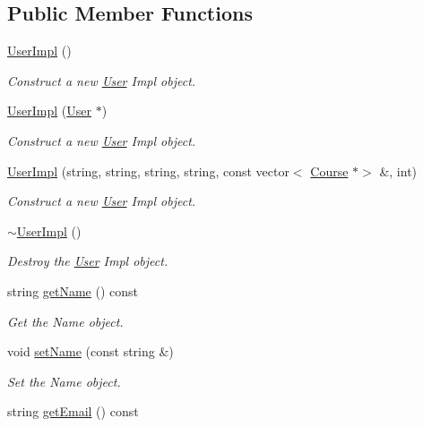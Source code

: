\subsection*{Public Member Functions}
\begin{DoxyCompactItemize}
\item 
\hyperlink{classUserImpl_a247633b3d3fb9449719bd9c12873b4cb}{User\+Impl} ()
\begin{DoxyCompactList}\small\item\em Construct a new \hyperlink{classUser}{User} Impl object. \end{DoxyCompactList}\item 
\hyperlink{classUserImpl_a5c9de4c05578de165fe9c7b8d2138831}{User\+Impl} (\hyperlink{classUser}{User} $\ast$)
\begin{DoxyCompactList}\small\item\em Construct a new \hyperlink{classUser}{User} Impl object. \end{DoxyCompactList}\item 
\hyperlink{classUserImpl_a54977619bd2174542f04de58ec932fb5}{User\+Impl} (string, string, string, string, const vector$<$ \hyperlink{classCourse}{Course} $\ast$$>$ \&, int)
\begin{DoxyCompactList}\small\item\em Construct a new \hyperlink{classUser}{User} Impl object. \end{DoxyCompactList}\item 
\hyperlink{classUserImpl_ad138e8fe61218dbbe61a13ce9b17decc}{$\sim$\+User\+Impl} ()
\begin{DoxyCompactList}\small\item\em Destroy the \hyperlink{classUser}{User} Impl object. \end{DoxyCompactList}\item 
string \hyperlink{classUserImpl_afb305ca89d0de723270de3433e3b5fc1}{get\+Name} () const
\begin{DoxyCompactList}\small\item\em Get the Name object. \end{DoxyCompactList}\item 
void \hyperlink{classUserImpl_a30507ad79190a2ad7d896b6c4a55fab4}{set\+Name} (const string \&)
\begin{DoxyCompactList}\small\item\em Set the Name object. \end{DoxyCompactList}\item 
string \hyperlink{classUserImpl_add6a78d438f5dc401b220c39c7d40a61}{get\+Email} () const
$$
\end{DoxyCompactItemize}
